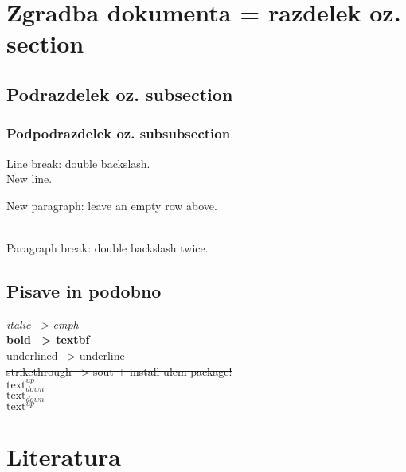 \documentclass[a4paper]{article}
\begin{document}

\section{Zgradba dokumenta = razdelek oz. section}
\subsection{Podrazdelek oz. subsection}
\subsubsection{Podpodrazdelek oz. subsubsection}

Line break: double backslash. \\
New line.


New paragraph: leave an empty row above. \\
\begin {raggedright}
\\ Paragraph break: double backslash twice.
\end{raggedright}


\subsection{Pisave in podobno}
\emph{italic --> emph} \\ 
\textbf{bold --> textbf} \\ 
\underline{underlined --> underline} \\ 
\sout{strikethrough --> sout + install ulem package!} \\ 
$\text{text}_{down}^{up}$ \\
$\text{text}_{down}$ \\ 
$\text{text}^{up}$ \\ 

\section{Literatura}
\end{document}
